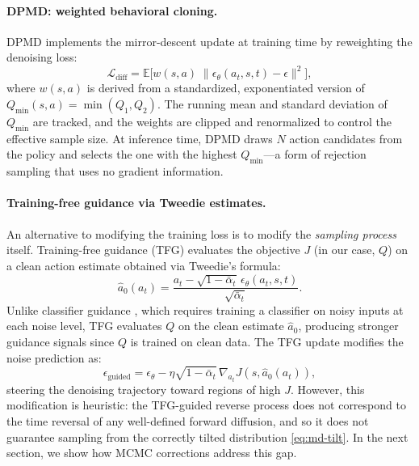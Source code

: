 \documentclass{article}
\theoremstyle{plain}
\theoremstyle{definition}
\theoremstyle{remark}
\newcommand{\E}{\mathbb{E}}
\begin{document}
\paragraph{DPMD: weighted behavioral cloning.}
DPMD \citep{ma2025soft} implements the mirror-descent update at training time by reweighting the denoising loss:
\begin{equation}
  \mathcal{L}_{\text{diff}} = \E\big[ w(s,a) \; \| \epsilon_\theta(a_t,s,t) - \epsilon \|^2 \big],
\end{equation}
where $w(s,a)$ is derived from a standardized, exponentiated version of $Q_{\min}(s,a) = \min(Q_1,Q_2)$.
The running mean and standard deviation of $Q_{\min}$ are tracked, and the weights are clipped and renormalized to control the effective sample size.
At inference time, DPMD draws $N$ action candidates from the policy and selects the one with the highest $Q_{\min}$---a form of rejection sampling that uses no gradient information.

\paragraph{Training-free guidance via Tweedie estimates.}
An alternative to modifying the training loss is to modify the \emph{sampling process} itself.
Training-free guidance (TFG) \citep{ye2024tfg,bansal2023universal} evaluates the objective $J$ (in our case, $Q$) on a clean action estimate obtained via Tweedie's formula:
\begin{equation}
  \hat{a}_0(a_t) = \frac{a_t - \sqrt{1-\bar{\alpha}_t}\, \epsilon_\theta(a_t, s, t)}{\sqrt{\bar{\alpha}_t}}.
  \label{eq:tweedie}
\end{equation}
Unlike classifier guidance \citep{dhariwal2021beatgans}, which requires training a classifier on noisy inputs at each noise level, TFG evaluates $Q$ on the clean estimate $\hat{a}_0$, producing stronger guidance signals since $Q$ is trained on clean data.
The TFG update modifies the noise prediction as:
\begin{equation}
  \epsilon_{\text{guided}} = \epsilon_\theta - \eta \sqrt{1-\bar{\alpha}_t}\, \nabla_{a_t} J(s, \hat{a}_0(a_t)),
  \label{eq:tfg-update}
\end{equation}
steering the denoising trajectory toward regions of high $J$.
However, this modification is heuristic: the TFG-guided reverse process does not correspond to the time reversal of any well-defined forward diffusion, and so it does not guarantee sampling from the correctly tilted distribution \cref{eq:md-tilt}.
In the next section, we show how MCMC corrections address this gap.
\end{document}

